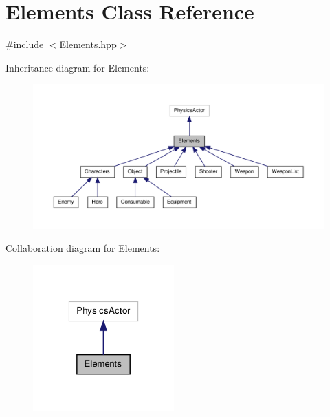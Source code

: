 \hypertarget{class_elements}{\section{Elements Class Reference}
\label{class_elements}
}


{\ttfamily \#include $<$Elements.\-hpp$>$}



Inheritance diagram for Elements\-:\nopagebreak
\begin{figure}[H]
\begin{center}
\leavevmode
\includegraphics[width=350pt]{class_elements__inherit__graph}
\end{center}
\end{figure}


Collaboration diagram for Elements\-:\nopagebreak
\begin{figure}[H]
\begin{center}
\leavevmode
\includegraphics[width=154pt]{class_elements__coll__graph}
\end{center}
\end{figure}
